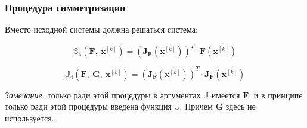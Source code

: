 \documentclass[12pt, a4paper]{article}
\newcommand{\roubr}[1]{\left(#1\right)}
\begin{document}
\subsubsection{Процедура симметризации}

Вместо исходной системы должна решаться система:

$$ \mathbb{S}_4\roubr{\mathbf{F},\ \mathbf{x}^{[k]}} = \roubr{\mathbf{J}_\mathbf{F}\roubr{\mathbf{x}^{[k]}}}^T \cdot \mathbf{F}\roubr{\mathbf{x}^{[k]}} $$

$$ \mathbb{J}_4\roubr{\mathbf{F},\ \mathbf{G},\ \mathbf{x}^{[k]}} = \roubr{\mathbf{J}_\mathbf{F}\roubr{\mathbf{x}^{[k]}}}^T \cdot \mathbf{J}_\mathbf{F}\roubr{\mathbf{x}^{[k]}} $$

\textit{Замечание:} только ради этой процедуры в аргументах $\mathbb{J}$ имеется $\mathbf{F}$, и в принципе только ради этой процедуры введена функция $\mathbb{J}$. Причем $\mathbf{G}$ здесь не используется.
\end{document}
